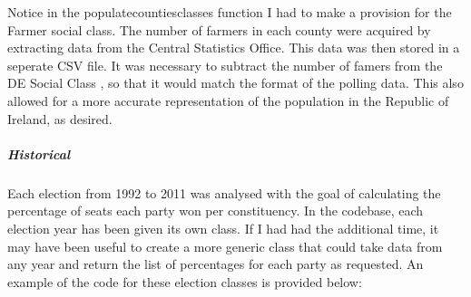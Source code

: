 Notice in the populate\textunderscore counties\textunderscore classes function I had to make a provision for the Farmer social class. The number of farmers in each county were acquired by extracting data from the Central Statistics Office. This data was then stored in a seperate CSV file. It was necessary to subtract the number of famers from the DE Social Class \cite{pfizer}, so that it would match the format of the polling data. This also allowed for a more accurate representation of the population in the Republic of Ireland, as desired.
\subparagraph{Historical}
Each election from 1992 to 2011 was analysed with the goal of calculating the percentage of seats each party won per constituency. In the codebase, each election year has been given its own class. If I had had the additional time, it may have been useful to create a more generic class that could take data from any year and return the list of percentages for each party as requested.  An example of the code for these election classes is provided below: 
